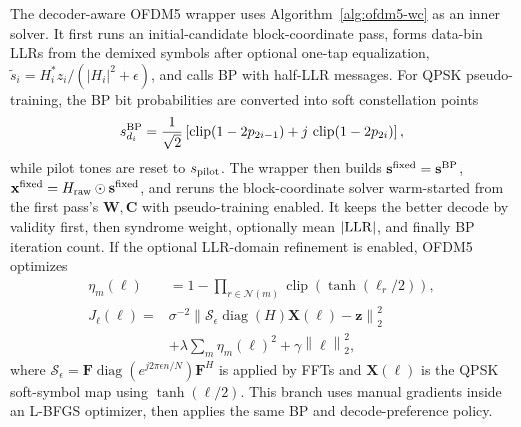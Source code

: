 \documentclass[journal]{IEEEtran}
\newcommand{\norm}[1]{\left\lVert #1 \right\rVert}
\newcommand{\abs}[1]{\left\lvert #1 \right\rvert}
\begin{document}
The decoder-aware OFDM5 wrapper uses Algorithm~\ref{alg:ofdm5-wc} as an inner
solver. It first runs an initial-candidate block-coordinate pass, forms data-bin LLRs from the
demixed symbols after optional one-tap equalization,
\(\tilde s_i=H_i^*z_i/(\abs{H_i}^2+\epsilon)\), and calls BP with half-LLR
messages. For QPSK pseudo-training, the BP bit probabilities are converted into
soft constellation points
\begin{equation}
  s^{\rm BP}_{d_i}
  =\frac{1}{\sqrt2}\left[
    \operatorname{clip}(1-2p_{2i-1})+
    j\,\operatorname{clip}(1-2p_{2i})\right],
  \label{eq:ofdm5-wrapper-soft-qpsk}
\end{equation}
while pilot tones are reset to \(s_{\rm pilot}\). The wrapper then builds
\(\mathbf s^{\rm fixed}=\mathbf s^{\rm BP}\),
\(\mathbf x^{\rm fixed}=H_{\rm raw}\odot\mathbf s^{\rm fixed}\), and reruns the
block-coordinate solver warm-started from the first pass's \(\mathbf W,\mathbf C\)
with pseudo-training enabled. It keeps the better decode by validity first,
then syndrome weight, optionally mean \(|{\rm LLR}|\), and finally BP iteration
count. If the optional LLR-domain refinement is enabled, OFDM5 optimizes
\begin{equation}
\begin{aligned}
  \eta_m(\boldsymbol\ell)
  &=1-\prod_{r\in\mathcal N(m)}
    \operatorname{clip}\!\left(\tanh(\ell_r/2)\right),\\
  J_{\ell}(\boldsymbol\ell)
  ={}&\sigma^{-2}\norm{
    \mathcal S_\epsilon\operatorname{diag}(H)\mathbf X(\boldsymbol\ell)
    -\mathbf z}_2^2\\
  &+\lambda\sum_m\eta_m(\boldsymbol\ell)^2
    +\gamma\norm{\boldsymbol\ell}_2^2 ,
\end{aligned}
  \label{eq:ofdm5-wrapper-llr-loss}
\end{equation}
where \(\mathcal S_\epsilon=\mathbf F\operatorname{diag}
(e^{j2\pi\epsilon n/N})\mathbf F^H\) is applied by FFTs and
\(\mathbf X(\boldsymbol\ell)\) is the QPSK soft-symbol map using
\(\tanh(\ell/2)\). This branch uses manual gradients inside an L-BFGS optimizer,
then applies the same BP and decode-preference policy.
\end{document}
